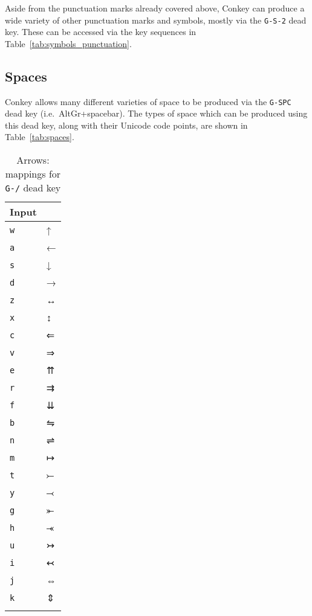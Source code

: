 \documentclass[oneside]{memoir}
\newcommand{\key}{\verb}
\newcommand{\keynv}{\texttt}
\begin{document}
Aside from the punctuation marks already covered above,
  Conkey can produce a wide variety of other punctuation marks and symbols,
  mostly via the \key|G-S-2| dead key.
These can be accessed via the key sequences in Table~\ref{tab:symbols_punctuation}.

\subsection{Spaces}
\label{sec:spaces}

Conkey allows many different varieties of space to be produced via the \key|G-SPC| dead key
  (i.e.\ AltGr+spacebar).
The types of space which can be produced using this dead key,
  along with their Unicode code points,
  are shown in Table~\ref{tab:spaces}.

\begin{table}
\caption{Arrows: mappings for \keynv{G-/} dead key}
\label{tab:arrows}
\centering
\begin{tabular}{l>{\fallbackfontsymbol}l}
\toprule
Input & \multicolumn{1}{l}{Result} \\
\midrule
\key|w| & ↑ \\
\key|a| & ← \\
\key|s| & ↓ \\
\key|d| & → \\
\key|z| & ↔ \\
\key|x| & ↕ \\
\key|c| & ⇐ \\
\key|v| & ⇒ \\
\key|e| & ⇈ \\
\key|r| & ⇉ \\
\key|f| & ⇊ \\
\key|b| & ⇋ \\
\key|n| & ⇌ \\
\key|m| & ↦ \\
\key|t| & ⤚ \\
\key|y| & ⤙ \\
\key|g| & ⤜ \\
\key|h| & ⤛ \\
\key|u| & ↣ \\
\key|i| & ↢ \\
\key|j| & ⇔ \\
\key|k| & ⇕ \\
\bottomrule&
\end{tabular}
\end{table}
\end{document}
